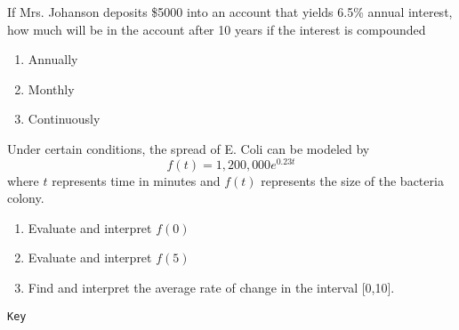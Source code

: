 \documentclass{article}
\newcounter{pset}
\begin{document}
If Mrs. Johanson deposits \$5000 into an account that yields 6.5\% annual interest, how much will be in the account after 10 years if the interest is compounded
\begin{multicols}{3}
\begin{enumerate}   \setcounter{enumi}{\value{pset}}
    \item Annually
    \item Monthly 
    \item Continuously
\end{enumerate} \setcounter{pset}{\value{enumi}}
\end{multicols}

Under certain conditions, the spread of E. Coli can be modeled by
\[
f(t) = 1,200,000e^{0.23t}
\]
where $t$ represents time in minutes and $f(t)$ represents the size of the bacteria colony.
\begin{enumerate}   \setcounter{enumi}{\value{pset}}
    \item Evaluate and interpret $f(0)$
    \item Evaluate and interpret $f(5)$
    \item Find and interpret the average rate of change in the interval [0,10].
\end{enumerate} \setcounter{pset}{\value{enumi}}

\newpage

\texttt{Key} \newline 
\end{document}

